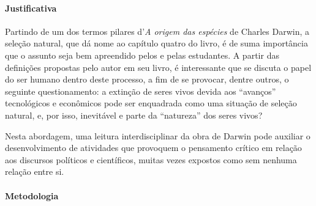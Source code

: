 \documentclass[11pt]{extarticle}
\begin{document}
\paragraph{Justificativa} Partindo de um dos termos pilares d'\textit{A origem das espécies}
de Charles Darwin, a seleção natural, que dá nome ao capítulo quatro do livro, 
é de suma importância que o assunto seja bem apreendido pelos e pelas estudantes. 
A partir das definições propostas pelo autor em seu livro, é interessante que
se discuta o papel do ser humano dentro deste processo, a fim de se provocar, dentre
outros, o seguinte questionamento: a extinção de seres vivos devida aos ``avanços'' 
tecnológicos e econômicos pode ser enquadrada como uma situação de seleção natural,
e, por isso, inevitável e parte da ``natureza'' dos seres vivos? 

Nesta abordagem, uma leitura interdisciplinar da obra de Darwin pode auxiliar
o desenvolvimento de atividades que provoquem o pensamento crítico em relação
aos discursos políticos e científicos, muitas vezes expostos como sem nenhuma
relação entre si. 

\paragraph{Metodologia}
\end{document}
